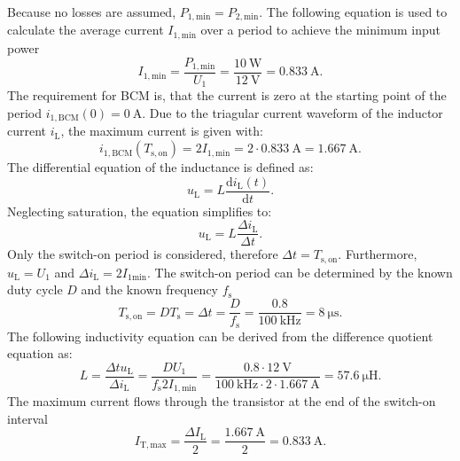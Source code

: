 \begin{solutionblock}
    Because no losses are assumed, $P_{\mathrm{1,min}}=P_{\mathrm{2,min}}$.
    The following equation is used to calculate the average current $I_{\mathrm{1,min}}$ over a period to achieve the minimum input power
    \begin{equation}
        I_{\mathrm{1,min}} = \frac{P_{\mathrm{1,min}}}{U_{\mathrm{1}}} = \frac{\SI{10}{\watt}}{\SI{12}{\volt}}= \SI{0.833}{\ampere}.
    \end{equation}
    The requirement for BCM is, that the current is zero at the starting point of the period  $i_\mathrm{1,BCM}(0)=\SI{0}{\ampere}$.
    Due to the triagular current waveform of the inductor current $i_{\mathrm{L}}$, the maximum current is given with:
    \begin{equation}
        i_\mathrm{1,BCM}(T_{\mathrm{s,on}})= 2I_{\mathrm{1,min}}= 2\cdot \SI{0.833}{\ampere} = \SI{1.667}{\ampere}.
    \end{equation}
    The differential equation of the inductance is defined as:
    \begin{equation}
        u_\mathrm{L}=L\frac{\mathrm{d}i_\mathrm{L}(t)}{\mathrm{d}t}.
    \end{equation}
    Neglecting saturation, the equation simplifies to:
    \begin{equation}
        u_\mathrm{L}=L\frac{\Delta i_\mathrm{L}}{\Delta t}.
    \end{equation}
    Only the switch-on period is considered, therefore $\Delta t = T_{\mathrm{s,on}}$. Furthermore, $u_\mathrm{L}=U_\mathrm{1}$ and $\Delta i_\mathrm{L} = 2 I_\mathrm{1min}$.
    The switch-on period can be determined by the known duty cycle $D$ and the known frequency $f_{\mathrm{s}}$
    \begin{equation}
        T_{\mathrm{s,on}} = D T_{\mathrm{s}} = \Delta t = \frac{D}{f_{\mathrm{s}}} = \frac{0.8}{\SI{100}{\kilo\hertz}}=\SI{8}{\micro\second}.
    \end{equation}
    The following inductivity equation can be derived from the difference quotient equation as:
    \begin{equation}
        L=\frac{\Delta t u_\mathrm{L} }{\Delta i_\mathrm{L}}= \frac{D U_\mathrm{1}}{f_{\mathrm{s}}2I_{\mathrm{1,min}}} = \frac{0.8 \cdot \SI{12}{\volt}}{\SI{100}{\kilo\hertz\cdot 2\cdot \SI{1.667}{\ampere}}} = \SI{57.6}{\micro\henry}.
    \end{equation}
    The maximum current flows through the transistor at the end of the switch-on interval
    \begin{equation}
        I_\mathrm{T,max} = \frac{\Delta I_\mathrm{L}}{2}=\frac{\SI{1.667}{\ampere}}{2} = \SI{0.833}{\ampere}.
    \end{equation}
\end{solutionblock}

